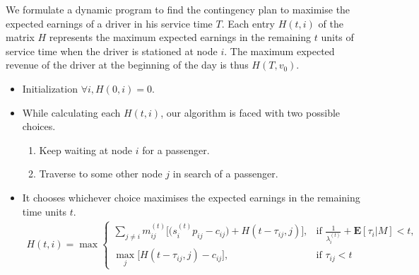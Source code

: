 We formulate a dynamic program to find the contingency plan to maximise the expected earnings of a driver in his service time $T$. Each entry $H(t,i)$ of the matrix $H$ represents the maximum expected earnings in the remaining $t$ units of service time when the driver is stationed at node $i$. The maximum expected revenue of the driver at the beginning of the day is thus $H(T, v_0)$.

\begin{itemize}
\item Initialization
    $\forall i, H(0,i) = 0$.
    
\item While calculating each $H(t,i)$, our algorithm is faced with two possible choices.
    \begin{enumerate}
    \item Keep waiting at node $i$ for a passenger.
    \item Traverse to some other node $j$ in search of a passenger.
    \end{enumerate}
\item It chooses whichever choice maximises the expected earnings in the remaining time units $t$. 
\begin{eqnarray*}
H(t,i) = \max
    \begin{cases}
    \sum\limits_{j\neq i}m_{ij}^{(t)}\bigg[\Big(s_{i}^{(t)} p_{ij} - c_{ij}\Big) + H(t-\tau_{ij},j)\bigg], & \text{if } \frac{1}{\lambda_i^{(t)}} + \mathbf{E}[\tau_i|M] < t,\\
    \max\limits_{j}\Big[H(t-\tau_{ij},j) - c_{ij}\Big], & \text{if } \tau_{ij} < t
    \end{cases}
\end{eqnarray*}
\end{itemize}
